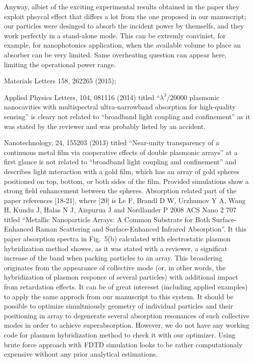 \documentclass[a4paper]{article}
\begin{document}
Anyway, albiet of the exciting experimental results obtained in the
paper they exploit phsycal effect that differs a lot from the one
proposed in our manuscript; our particles were desinged to absorb the
incident power by themselfs, and they work perfectly in a stand-alone
mode.  This can be extremly conviniet, for example, for nanophotonics
application, when the available volume to place an absorber can be
very limited. Same overheating question can appear here, limiting the
operational power range.


Materials Letters 158, 262265 (2015);

Applied Physics Letters, 104, 081116 (2014) titled ``$\lambda^3$/20000
plasmonic nanocavities with multispectral ultra-narrowband absorption
for high-quality sensing'' is cleary not related to ``broadband light
coupling and confinement'' as it was stated by the reviewer and was
probably listed by an accident.

Nanotechnology, 24, 155203 (2013) titled ``Near-unity transparency of
a continuous metal film via cooperative effects of double plasmonic
arrays'' at a first glance is not related to ``broadband light
coupling and confinement'' and describes light interaction with a gold
film, which has an array of gold spheres positioned on top, bottom, or
both sides of the film.  Provided simulations show a strong field
enhancement between the spheres. Absorption related part of the paper
references [18-21], where [20] is Le F, Brandl D W, Urzhumov Y A, Wang
H, Kundu J, Halas N J, Aizpurua J and Nordlander P 2008 ACS Nano 2 707
titled ``Metallic Nanoparticle Arrays: A Common Substrate for Both
Surface-Enhanced Raman Scattering and Surface-Enhanced Infrared
Absorption''.  It this paper absorption spectra in Fig.~5(b)
calculated with electrostatic plasmon hybridization method showes, as
it was stated with a reviewer, a significat increase of the band when
packing particles to an array. This broadering originates from the
appearance of collective mode (or, in other words, the hybridization
of plasmon responce of several particles) with additional impact from
retardation effects. It can be of great intereset (including applied
examples) to apply the same approch from our manuscript to this
system. It should be possible to optimize simultniously geometry of
individual particles and their positioning in array to degenerate
several absorption resonances of such collective modes in order to
achieve superabsorption. However, we do not have any working code for
plasmon hybridization method to check it with our optimizer. Using
brute force approach with FDTD simulation looks to be rather
computationaly expensive without any prior analytical estimations.
\end{document}
